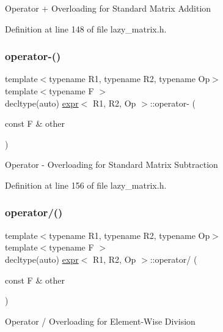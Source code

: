 Operator + Overloading for Standard Matrix Addition 

Definition at line 148 of file lazy\+\_\+matrix.\+h.

\mbox{\label{classexpr_ab46b7e78ad487b606b12e81c24cb3eeb}} 
\subsubsection{\texorpdfstring{operator-\/()}{operator-()}}
{\footnotesize\ttfamily template$<$typename R1, typename R2, typename Op$>$ \\
template$<$typename F $>$ \\
decltype(auto) \mbox{\hyperlink{classexpr}{expr}}$<$ R1, R2, Op $>$\+::operator-\/ (\begin{DoxyParamCaption}\item[{const F \&}]{other }\end{DoxyParamCaption})\hspace{0.3cm}{\ttfamily [inline]}}

Operator -\/ Overloading for Standard Matrix Subtraction 

Definition at line 156 of file lazy\+\_\+matrix.\+h.

\mbox{\label{classexpr_abf2a263cd1346fe818d886cdc94ae4d0}} 
\subsubsection{\texorpdfstring{operator/()}{operator/()}}
{\footnotesize\ttfamily template$<$typename R1, typename R2, typename Op$>$ \\
template$<$typename F $>$ \\
decltype(auto) \mbox{\hyperlink{classexpr}{expr}}$<$ R1, R2, Op $>$\+::operator/ (\begin{DoxyParamCaption}\item[{const F \&}]{other }\end{DoxyParamCaption})\hspace{0.3cm}{\ttfamily [inline]}}

Operator / Overloading for Element-\/\+Wise Division 

